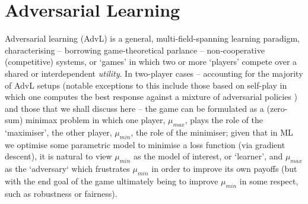 \section{Adversarial Learning}\label{sec:adv-learning}
Adversarial learning (AdvL) is a general, multi-field-spanning learning paradigm, characterising --
borrowing game-theoretical parlance -- non-cooperative (competitive) systems, or `games' in which
two or more `players' compete over a shared or interdependent
\emph{utility}.
%
In two-player cases -- accounting for the majority of AdvL setups (notable exceptions to this
include those based on self-play in which one computes the best response against a mixture of
adversarial policies \citep{silver2017mastering, vinyals2019grandmaster}) and those that we shall
discuss here -- the game can be formulated as a (zero-sum) minimax problem in which one player,
\(\mu_{max}\), plays the role of the `maximiser', the other player, \(\mu_{min}\), the role of the
minimiser; given that in ML we optimise some parametric model to minimise a loss function (via
gradient descent), it is natural to view \(\mu_{min}\) as the model of interest, or `learner', and
\(\mu_{max}\) as the `adversary` which frustrates \(\mu_{min}\) in order to improve its own payoffs
(but with the end goal of the game ultimately being to improve \(\mu_{min}\) in some respect, such
as robustness or fairness).
%

